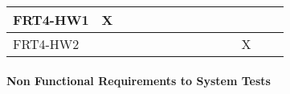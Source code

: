 \documentclass[12pt, titlepage]{article}
\begin{document}
\begin{table}[ht]
{\begin{tabular}{llllllllllllll}
\multicolumn{1}{|l|}{FRT4-HW1}   & \multicolumn{1}{l|}{X} & \multicolumn{1}{l|}{}  & \multicolumn{1}{l|}{}  & \multicolumn{1}{l|}{}  & \multicolumn{1}{l|}{}  & \multicolumn{1}{l|}{}  & \multicolumn{1}{l|}{}  & \multicolumn{1}{l|}{}  & \multicolumn{1}{l|}{}  & \multicolumn{1}{l|}{}   & \multicolumn{1}{l|}{}   & \multicolumn{1}{l|}{}   & \multicolumn{1}{l|}{}   \\ \hline
\multicolumn{1}{|l|}{FRT4-HW2}   & \multicolumn{1}{l|}{}  & \multicolumn{1}{l|}{}  & \multicolumn{1}{l|}{}  & \multicolumn{1}{l|}{}  & \multicolumn{1}{l|}{}  & \multicolumn{1}{l|}{}  & \multicolumn{1}{l|}{}  & \multicolumn{1}{l|}{}  & \multicolumn{1}{l|}{}  & \multicolumn{1}{l|}{}   & \multicolumn{1}{l|}{X}  & \multicolumn{1}{l|}{}   & \multicolumn{1}{l|}{}   \\ \hline
\end{tabular}}
\end{table}

\paragraph{Non Functional Requirements to System Tests}
\end{document}

